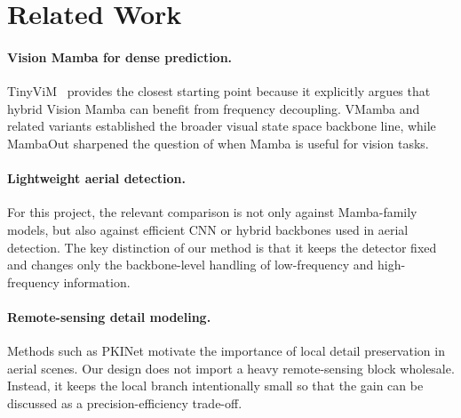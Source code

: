 \section{Related Work}

\paragraph{Vision Mamba for dense prediction.}
TinyViM~\cite{tinyvim2024} provides the closest starting point because it explicitly argues that hybrid Vision Mamba can benefit from frequency decoupling. VMamba and related variants established the broader visual state space backbone line, while MambaOut sharpened the question of when Mamba is useful for vision tasks.

\paragraph{Lightweight aerial detection.}
For this project, the relevant comparison is not only against Mamba-family models, but also against efficient CNN or hybrid backbones used in aerial detection. The key distinction of our method is that it keeps the detector fixed and changes only the backbone-level handling of low-frequency and high-frequency information.

\paragraph{Remote-sensing detail modeling.}
Methods such as PKINet motivate the importance of local detail preservation in aerial scenes. Our design does not import a heavy remote-sensing block wholesale. Instead, it keeps the local branch intentionally small so that the gain can be discussed as a precision-efficiency trade-off.

